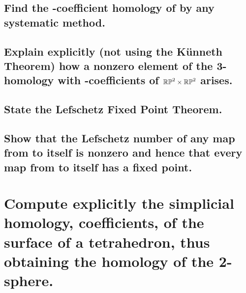 \documentclass[10pt]{article}
\begin{document}
\advsection{}

\subsection{Find the \Z-coefficient homology of  by any systematic
  method.}

\subsection{Explain explicitly (not using the K\"unneth Theorem) how a nonzero element of the
  3-homology with \Z-coefficients of $\mathbb{RP}^{2} \times \mathbb{RP}^{2}$ arises.}

\advsection{}

\subsection{State the Lefschetz Fixed Point Theorem.}

\subsection{Show that the Lefschetz number of any map from  to itself is nonzero
  and hence that every map from  to itself has a fixed point. }

\section{Compute explicitly the simplicial homology, \Z coefficients, of the surface of a
  tetrahedron, thus obtaining the homology of the 2-sphere.}
\end{document}
